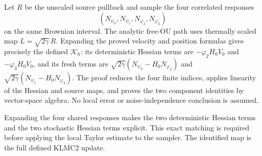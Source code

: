 \documentclass[11pt,a4paper]{article}
\begin{document}
Let \(R\) be the unscaled source pullback and sample the four correlated responses
\[(N_{\psi_0},N_{\psi_1},N_{\varphi_2},N_{\varphi_3})\]
 on the same Brownian interval. The analytic free-OU path uses thermally scaled map \(L=\sqrt{2\gamma}\,R\). Expanding the proved velocity and position formulas gives precisely the defined \(\mathcal K_h\): its deterministic Hessian terms are \(-\varphi_2H_0V_0\) and \(-\varphi_3H_0V_0\), and its fresh terms are \(\sqrt{2\gamma}(N_{\psi_0}-H_0N_{\varphi_2})\) and \(\sqrt{2\gamma}(N_{\psi_1}-H_0N_{\varphi_3})\). The proof reduces the four finite indices, applies linearity of the Hessian and source maps, and proves the two component identities by vector-space algebra. No local error or noise-independence conclusion is assumed.



Expanding the four shared responses makes the two deterministic Hessian terms and the two stochastic Hessian terms explicit. This exact matching is required before applying the local Taylor estimate to the sampler. The identified map is the full defined KLMC2 update.
\end{document}
